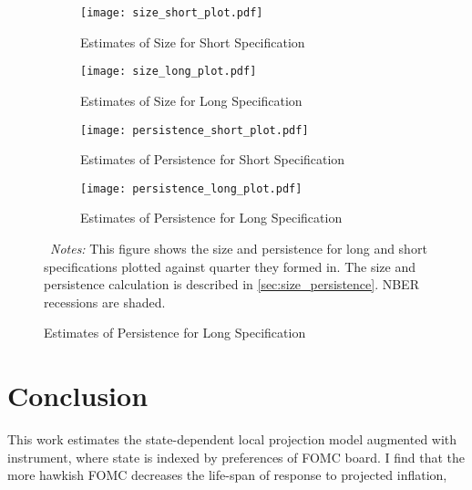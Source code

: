 \documentclass[11pt]{article}
\begin{document}
\begin{figure}[!hptb]\centering
  \caption{Size and Persistence Dynamics}
  \label{fig:size_persistence_plot}
  \vspace{1ex}
  \begin{minipage}{0.92\textwidth}
    \begin{subfigure}[b]{0.494\textwidth}\centering
      \caption{Estimates of Size for Short Specification}
    \texttt{[image: size\_short\_plot.pdf]}
    \end{subfigure}\hfill   \begin{subfigure}[b]{0.494\textwidth}\centering
      \caption{Estimates of Size for Long Specification}
    \texttt{[image: size\_long\_plot.pdf]}
    \end{subfigure}
    \vspace{1ex}
    \begin{subfigure}[b]{0.494\textwidth}\centering
      \caption{Estimates of Persistence for Short Specification}
    \texttt{[image: persistence\_short\_plot.pdf]}
    \end{subfigure}\hfill
    \begin{subfigure}[b]{0.494\textwidth}\centering      \caption{Estimates of Persistence for Long Specification}
    \texttt{[image: persistence\_long\_plot.pdf]}
    \end{subfigure}
    \begin{flushleft}\scriptsize
    ~\textit{Notes:} This figure shows the size and persistence for long and short specifications plotted against quarter they formed in. The size and persistence calculation is described in \vref{sec:size_persistence}. 
    NBER recessions are shaded.
    \end{flushleft}
  \end{minipage}  
\end{figure}

\section{Conclusion}

This work estimates the state-dependent local projection model augmented with instrument, where state is indexed by preferences of FOMC board. 
I find that the more hawkish FOMC decreases the life-span of response to  projected inflation, 





\end{document}
